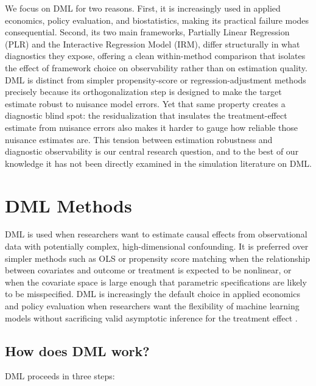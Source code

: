 \documentclass[12pt]{article}
\begin{document}
We focus on DML for two reasons. First, it is increasingly used in applied economics, policy evaluation, and biostatistics, making its practical failure modes consequential. Second, its two main frameworks, Partially Linear Regression (PLR) and the Interactive Regression Model (IRM), differ structurally in what diagnostics they expose, offering a clean within-method comparison that isolates the effect of framework choice on observability rather than on estimation quality. DML is distinct from simpler propensity-score or regression-adjustment methods \citep{Rosenbaum1983} precisely because its orthogonalization step is designed to make the target estimate robust to nuisance model errors. Yet that same property creates a diagnostic blind spot: the residualization that insulates the treatment-effect estimate from nuisance errors also makes it harder to gauge how reliable those nuisance estimates are. This tension between estimation robustness and diagnostic observability is our central research question, and to the best of our knowledge it has not been directly examined in the simulation literature on DML.

\section{DML Methods}

DML is used when researchers want to estimate causal effects from observational data with potentially complex, high-dimensional confounding. It is preferred over simpler methods such as OLS or propensity score matching when the relationship between covariates and outcome or treatment is expected to be nonlinear, or when the covariate space is large enough that parametric specifications are likely to be misspecified. DML is increasingly the default choice in applied economics and policy evaluation when researchers want the flexibility of machine learning models without sacrificing valid asymptotic inference for the treatment effect \citep{Knaus2022}.

\subsection{How does DML work?}

DML proceeds in three steps:
\end{document}
